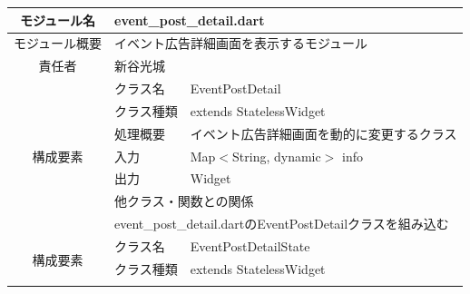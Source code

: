 \begin{table}[H]
  \centering
  \begin{tabular}{|c|l|l|} \hline
    モジュール名                & \multicolumn{2}{l|}{event\_post\_detail.dart}                                                                                  \\ \hline
    モジュール概要               & \multicolumn{2}{p{12cm}|}{イベント広告詳細画面を表示するモジュール}                                                                                \\ \hline
    責任者                   & \multicolumn{2}{l|}{新谷光城}                                                                                                      \\ \hline
    \multirow{7}{*}{構成要素} & クラス名                                                                        & EventPostDetail                                  \\ \cline{2-3}
                          & クラス種類                                                                       & extends StatelessWidget                          \\ \cline{2-3}
                          & 処理概要                                                                        & \multicolumn{1}{p{12cm}|}{イベント広告詳細画面を動的に変更するクラス} \\ \cline{2-3}
                          & 入力                                                                          & Map$<$String, dynamic$>$ info                    \\ \cline{2-3}
                          & 出力                                                                          & Widget                                           \\ \cline{2-3}
                          & \multicolumn{2}{l|}{他クラス・関数との関係}                                                                                               \\ \cline{2-3}
                          & \multicolumn{2}{p{14cm}|}{event\_post\_detail.dartのEventPostDetailクラスを組み込む}                                                    \\ \hline
    \multirow{7}{*}{構成要素} & クラス名                                                                        & EventPostDetailState                             \\ \cline{2-3}
                          & クラス種類                                                                       & extends StatelessWidget                          \\ \cline{2-3}

\end{tabular}
\end{table}
